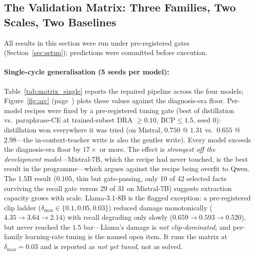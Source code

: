 \subsection{The Validation Matrix: Three Families, Two Scales, Two Baselines}
\label{sec:results_matrix}

All results in this section were run under pre-registered gates (Section~\ref{sec:setup}); predictions were committed before execution.

\paragraph{Single-cycle generalisation (5 seeds per model):} Table~\ref{tab:matrix_single} reports the repaired pipeline across the four models; Figure~\ref{fig:arc} (page~\pageref{fig:arc}) plots these values against the diagnosis-era floor. Per-model recipes were fixed by a pre-registered tuning gate (best of distillation vs.\ paraphrase-CE at trained-subset DRA $\geq 0.10$, $\mathrm{BCP} \leq 1.5$, seed 0): distillation won everywhere it was tried (on Mistral, $0.750$ @ $1.31$ vs.\ $0.655$ @ $2.98$---the in-context-teacher write is also the gentler write). Every model exceeds the diagnosis-era floor by $17\times$ or more. The effect is \emph{strongest off the development model}---Mistral-7B, which the recipe had never touched, is the best result in the programme---which argues against the recipe being overfit to Qwen. The $1.5$B result ($0.105$, thin but gate-passing, only 10 of 42 selected facts surviving the recall gate versus 29 of 31 on Mistral-7B) suggests extraction capacity grows with scale. Llama-3.1-8B is the flagged exception: a pre-registered clip ladder ($\delta_{\max} \in \{0.1, 0.05, 0.03\}$) reduced damage monotonically ($4.35 \to 3.64 \to 2.14$) with recall degrading only slowly ($0.659 \to 0.593 \to 0.520$), but never reached the $1.5$ bar---Llama's damage is \emph{not clip-dominated}, and per-family learning-rate tuning is the named open item. It runs the matrix at $\delta_{\max}=0.03$ and is reported as \emph{not yet tuned}, not as solved.

